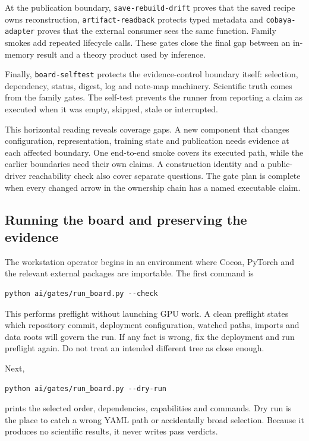 \documentclass[10pt,aps,prd,twocolumn,nofootinbib]{revtex4-2}
\newcommand{\code}[1]{\texttt{#1}}
\begin{document}
At the publication boundary, \code{save-rebuild-drift} proves that the saved
recipe owns reconstruction, \code{artifact-readback} protects typed metadata
and \code{cobaya-adapter} proves that the external consumer sees the same
function.  Family smokes add repeated
lifecycle calls.  These gates close the final gap between an in-memory result
and a theory product used by inference.

Finally, \code{board-selftest} protects the evidence-control boundary itself:
selection, dependency, status, digest, log and note-map machinery.  Scientific
truth comes from the family gates.  The self-test prevents the runner from
reporting a claim as executed when it was empty, skipped, stale or interrupted.

This horizontal reading reveals coverage gaps.  A new component that changes
configuration, representation, training state and publication needs evidence
at each affected boundary.  One end-to-end smoke covers its executed path,
while the earlier boundaries need their own claims.  A construction identity
and a public-driver reachability check also cover separate questions.  The
gate plan is complete when every changed arrow in the ownership chain has a
named executable claim.

\subsection{Running the board and preserving the evidence}

The workstation operator begins in an environment where Cocoa, PyTorch and
the relevant external packages are importable.  The first command is
\begin{verbatim}
python ai/gates/run_board.py --check
\end{verbatim}
This performs preflight without launching GPU work.  A clean preflight states
which repository commit, deployment configuration, watched paths, imports and
data roots will govern the run.  If any fact is wrong, fix the deployment and
run preflight again.  Do not treat an intended different tree as close enough.

Next,
\begin{verbatim}
python ai/gates/run_board.py --dry-run
\end{verbatim}
prints the selected order, dependencies, capabilities and commands.  Dry run
is the place to catch a wrong YAML path or accidentally broad selection.
Because it produces no scientific results, it never writes pass verdicts.
\end{document}
